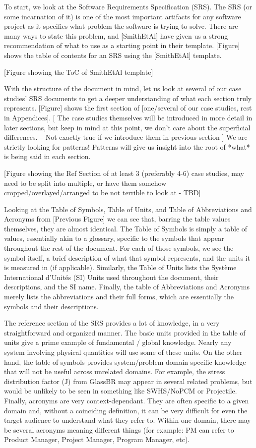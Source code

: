 To start, we look at the Software Requirements Specification (SRS). The SRS
(or some incarnation of it) is one of the most important artifacts for any
software project as it specifies what problem the software is trying to solve.
There are many ways to state this problem, and [SmithEtAl] have given us a
strong recommendation of what to use as a starting point in their template.
[Figure] shows the table of contents for an SRS using the [SmithEtAl] template.

[Figure showing the ToC of SmithEtAl template]

With the structure of the document in mind, let us look at several of our case
studies' SRS documents to get a deeper understanding of what each section truly
represents. [Figure] shows the first section of [one/several of our case studies, rest in Appendices].
[ The case studies themselves will be introduced in more detail in later sections, but
keep in mind at this point, we don't care about the superficial differences. -- Not exactly true if we introduce them in previous section ]
 We are strictly looking for patterns! Patterns will give us insight
into the root of *what* is being said in each section.

[Figure showing the Ref Section of at least 3 (preferably 4-6) case studies, may
need to be split into multiple, or have them somehow cropped/overlayed/arranged
to be not terrible to look at - TBD]

Looking at the Table of Symbols, Table of Units, and Table of Abbreviations and 
Acronyms from [Previous Figure] we can see that, barring the table values 
themselves, they are almost identical. The Table of Symbols is simply a table 
of values, essentially akin to a glossary, specific to the symbols that appear 
throughout the rest of the document. For each of those symbols, we see the 
symbol itself, a brief description of what that symbol represents, and the units
it is measured in (if applicable). Similarly, the Table of Units lists the
Système International d’Unités (SI) Units used throughout the document, their
descriptions, and the SI name. Finally, the table of Abbreviations and Acronyms
merely lists the abbreviations and their full forms, which are essentially the
symbols and their descriptions.

The reference section of the SRS provides a lot of knowledge, in a very 
straightforward and organized manner. The basic units provided in the table of 
units give a prime example of fundamental / global knowledge. Nearly any system
involving physical quantities will use some of these units. On the other hand, 
the table of symbols provides system/problem-domain specific knowledge that
will not be useful across unrelated domains. For example, the stress 
distribution factor (J) from GlassBR may appear in several related problems, but
would be unlikely to be seen in something like SWHS/NoPCM or Projectile. 
Finally, acronyms are very context-dependant. They are often specific to a
given domain and, without a coinciding definition, it can be very difficult for
even the target audience to understand what they refer to. Within one domain, 
there may be several acronyms meaning different things (for example: PM can 
refer to Product Manager, Project Manager, Program Manager, etc).


